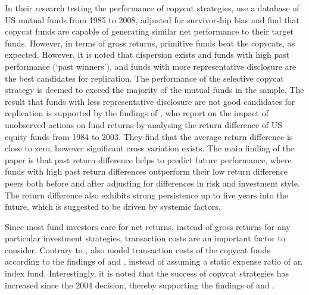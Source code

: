 \documentclass[12pt, a4]{article}
\begin{document}
In their research testing the performance of copycat strategies, \cite{verbeek} use a database of \textsc{US} mutual funds from 1985 to 2008, adjusted for survivorship bias and find that copycat funds are capable of generating similar net performance to their target funds. However, in terms of gross returns, primitive funds beat the copycats, as expected. However, it is noted that dispersion exists and funds with high past performance (`past winners'), and funds with more representative disclosure are the best candidates for replication. The performance of the selective copycat strategy is deemed to exceed the majority of the mutual funds in the sample. The result that funds with less representative disclosure are not good candidates for replication is supported by the findings of \cite{kacperczyk}, who report on the impact of unobserved actions on fund returns by analysing the return difference of \textsc{US} equity funds from 1984 to 2003. They find that the average return difference is close to zero, however significant cross variation exists. The main finding of the paper is that past return difference helps to predict future performance, where funds with high past return differences outperform their low return difference peers both before and after adjusting for differences in risk and investment style. The return difference also exhibits strong persistence up to five years into the future, which is suggested to be driven by systemic factors.

Since most fund investors care for net returns, instead of gross returns for any particular investment strategies, transaction costs are an important factor to consider. Contrary to \cite{frank}, \cite{verbeek} also model transaction costs of the copycat funds according to the findings of \cite{keim} and \cite{wermers_2000}, instead of assuming a static expense ratio of an index fund. Interestingly, it is noted that the success of copycat strategies has increased since the 2004 decision, thereby supporting the findings of \citeauthor{wermers_2000} and \cite{agarwal}.
\end{document}
